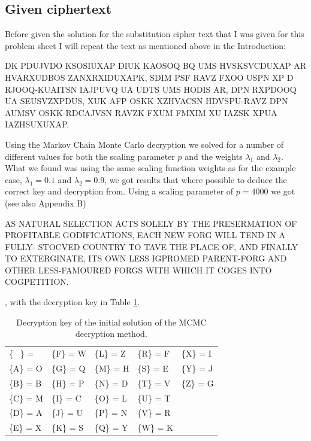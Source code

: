 \documentclass[a4paper, 11pt]{article}
\begin{document}
\subsection{Given ciphertext}

Before given the solution for the substitution cipher text that I was given
for this problem sheet I will repeat the text as mentioned above in the
Introduction:

\begin{adjustwidth}{1.5em}{0pt}
  \small
  DK PDUJVDO KSOSIUXAP DIUK KAOSOQ BQ UMS HVSKSVCDUXAP AR
  HVARXUDBOS ZANXRXIDUXAPK, SDIM PSF RAVZ FXOO USPN XP D RJOOQ-KUAITSN 
  IAJPUVQ UA UDTS UMS HODIS AR, DPN RXPDOOQ UA SEUSVZXPDUS, XUK
  AFP OSKK XZHVACSN HDVSPU-RAVZ DPN AUMSV OSKK-RDCAJVSN RAVZK FXUM
  FMXIM XU IAZSK XPUA IAZHSUXUXAP.
\end{adjustwidth}

Using the Markov Chain Monte Carlo decryption we solved for a number of
different values for both the scaling parameter $p$ and the weights 
$\lambda_1$ and $\lambda_2$. What we found was using the same scaling function
weights as for the example case, $\lambda_1 = 0.1$ and $\lambda_2 = 0.9$,
we got results that where possible to deduce the correct key and decryption
from. Using a scaling parameter of $p = 4000$ we got (see also Appendix B)

\begin{adjustwidth}{1.5em}{0pt}
  \small
  AS NATURAL SELECTION ACTS SOLELY BY THE PRESERMATION OF
  PROFITABLE GODIFICATIONS, EACH NEW FORG WILL TEND IN A FULLY-
  STOCVED COUNTRY TO TAVE THE PLACE OF, AND FINALLY TO EXTERGINATE, ITS
  OWN LESS IGPROMED PARENT-FORG AND OTHER LESS-FAMOURED FORGS WITH
  WHICH IT COGES INTO COGPETITION.
\end{adjustwidth}

, with the decryption key in Table \ref{tab:FirstKey}.

\begin{table}[h]
  \centering
  \caption{Decryption key of the initial solution of the MCMC decryption 
  method.}
  \begin{tabular}{l l l l l}
  \{ \ \} =    &  \{F\} = W  &  \{L\} = Z  &  \{R\} = F  &  \{X\} = I  \\
  \{A\} = O  &  \{G\} = Q  &  \{M\} = H  &  \{S\} = E  &  \{Y\} = J  \\
  \{B\} = B  &  \{H\} = P  &  \{N\} = D  &  \{T\} = V  &  \{Z\} = G  \\
  \{C\} = M  &  \{I\} = C  &  \{O\} = L  &  \{U\} = T  &  \ \\
  \{D\} = A  &  \{J\} = U  &  \{P\} = N  &  \{V\} = R  &  \ \\
  \{E\} = X  &  \{K\} = S  &  \{Q\} = Y  &  \{W\} = K  &  \ \\
  \end{tabular}
  \label{tab:FirstKey}
\end{table}
\end{document}
